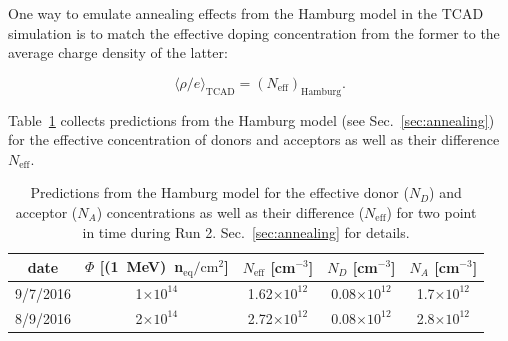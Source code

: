 One way to emulate annealing effects from the Hamburg model in the TCAD simulation is to match the effective doping concentration from the former to the average charge density of the latter: 

\begin{equation}
\langle \rho/e\rangle_\text{TCAD}=(N_\text{eff})_\text{Hamburg}.
\label{eq:SpaceChargeTCADHamburg}
\end{equation}

Table~\ref{tab:NeffHamburg} collects predictions from the Hamburg model (see Sec.~\ref{sec:annealing}) for the effective concentration of donors and acceptors as well as their difference $N_\text{eff}$. 

\begin{table}[!htpb]
\centering
\begin{tabular}{|c|c|c|c|c|}
  \hline
   date & $\Phi$ [(1~MeV)~n$_\text{eq}/\text{cm}^{2}$] & $N_\text{eff}$ [cm$^{-3}$] 
   & $N_D$ [cm$^{-3}$]	& $N_A$ [cm$^{-3}$]	\\
   \hline	
  9/7/2016 & 1$\times10^{14}$ & 1.62$\times10^{12}$ & 0.08$\times10^{12}$ & 1.7$\times10^{12}$ \\
 8/9/2016 & 2$\times10^{14}$ & 2.72$\times10^{12}$ & 0.08$\times10^{12}$ & 2.8$\times10^{12}$\\
  \hline  
\end{tabular}
\caption{\label{tab:NeffHamburg}Predictions from the Hamburg model for the effective donor ($N_D$) and acceptor ($N_A$) concentrations as well as their difference ($N_\text{eff}$) for two point in time during Run 2.  Sec.~\ref{sec:annealing} for details.}
\end{table}

